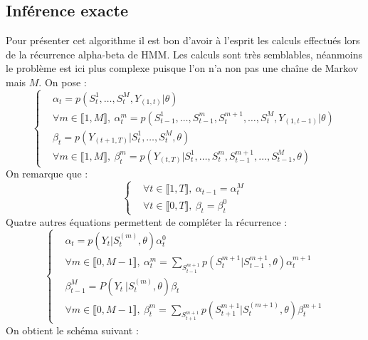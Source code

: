 \documentclass[10pt,a4paper]{article}
\newcommand{\hmm}{\textsc{HMM}}
\begin{document}
\subsection{Inférence exacte}

Pour présenter cet algorithme il est bon d'avoir à l'esprit les calculs 
effectués lors de la récurrence alpha-beta de \hmm. Les calculs sont très 
semblables, néanmoins le problème est ici plus complexe puisque l'on n'a non pas
une chaîne de Markov mais $M$. On pose :
\begin{equation}
\left\lbrace
\begin{aligned}
&\alpha_t=p(S_t^{1},\dots,S_t^{M},Y_{(1,t)}\vert \theta) \\
&\forall m \in \llbracket 1,M \rrbracket, \ \alpha_t^m=p(S_{t-1}^1, \dots, 
S_{t-1}^m,S_{t}^{m+1}, \dots, S_{t}^M, Y_{(1,t-1)} \vert \theta) \\
&\beta_t=p(Y_{(t+1,T)} \vert S_t^1, \dots,S_t^M, \theta) \\
&\forall m \in \llbracket 1,M \rrbracket, \ \beta_t^m=p(Y_{(t,T)} \vert S_t^1, 
\dots, S_t^m,S_{t-1}^{m+1}, \dots, S_{t-1}^M, \theta)
\end{aligned}
\right.
\end{equation}
On remarque que :
\begin{equation}
\left\lbrace 
\begin{aligned}
&\forall t \in \llbracket 1,T \rrbracket, \ \alpha_{t-1}=\alpha_{t}^M  \\
&\forall t \in \llbracket 0,T \rrbracket, \ \beta_{t}=\beta_{t}^0
\end{aligned}
\right.
\end{equation}
Quatre autres équations permettent de compléter la récurrence :
\begin{equation}
\left\lbrace
\begin{aligned}
&\alpha_t=p(Y_t \vert S_t^{(m)}, \theta)\alpha_t^0 \\
&\forall m \in \llbracket 0,M-1 \rrbracket, \ 
\alpha_t^m=\underset{S_{t-1}^{m+1}}{\sum}p(S_t^{m+1} \vert S_{t-1}^{m+1}, 
\theta) \alpha_t^{m+1} \\
&\beta_{t-1}^M=P( Y_t \ \vert S_t^{(m)},\theta) \beta_t \\
&\forall m \in \llbracket 0, M-1 \rrbracket, \ 
\beta_t^{m}=\underset{S_{t+1}^{m+1}}{\sum}p(S_{t+1}^{m+1} \vert S_{t}^{(m+1)}, 
\theta) \beta_{t}^{m+1}
\end{aligned}
\right.
\end{equation}
On obtient le schéma suivant :
\end{document}
